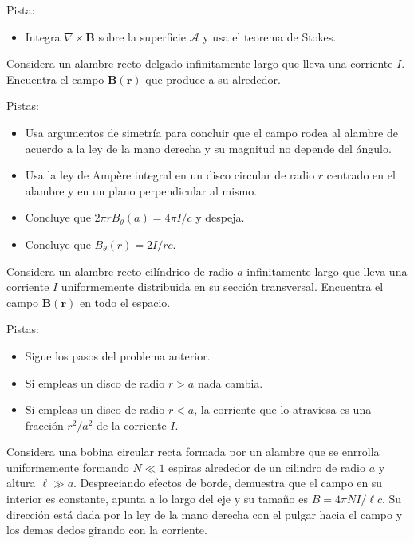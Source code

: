 \documentclass{exam}
\begin{document}
\begin{questions}
    Pista:
    \begin{itemize}
    \item Integra $\nabla\times\bm B$ sobre la superficie $\mathcal A$
      y usa el teorema de Stokes.
    \end{itemize}
  \question Considera un alambre recto delgado infinitamente largo que lleva
    una corriente $I$. Encuentra el campo $\bm B(\bm r)$ que produce a su
    alrededor.

    Pistas:
    \begin{itemize}
    \item Usa argumentos de simetría para concluir que el campo rodea
      al alambre de acuerdo a la ley de la mano derecha y su magnitud
      no depende del ángulo.
    \item Usa la ley de Ampère integral en un disco circular de radio
      $r$ centrado en el alambre y en un plano perpendicular al mismo.
    \item Concluye que $2\pi r B_\theta(a)=4\pi I/c$ y despeja.
    \item Concluye que $B_\theta(r)=2 I/rc$.
    \end{itemize}
  \question Considera un alambre recto cilíndrico de radio $a$
    infinitamente largo que lleva una corriente $I$ uniformemente
    distribuida en su sección transversal. Encuentra el campo $\bm
    B(\bm r)$ en todo el espacio.

    Pistas:
    \begin{itemize}
    \item Sigue los pasos del problema anterior.
    \item Si empleas un disco de radio $r>a$  nada cambia.
    \item Si empleas un disco de radio $r<a$, la corriente que lo
      atraviesa es una fracción $r^2/a^2$ de la corriente $I$.
    \end{itemize}

  \question Considera una bobina circular recta formada por un alambre
    que se enrrolla uniformemente formando $N\ll1$
    espiras alrededor de un cilindro de radio $a$ y altura $\ell\gg
    a$. Despreciando efectos de borde, demuestra que el campo en su
    interior es constante, apunta a lo largo del eje y su tamaño es
    $B=4\pi N I/\ell c$. Su dirección está dada por la ley de la mano
    derecha con el pulgar hacia el campo y los demas dedos girando con
    la corriente.


\end{questions}
\end{document}
